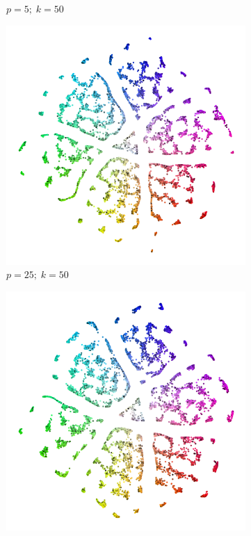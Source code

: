 \begin{figure}[!p]
\begin{subfigure}{0.3\linewidth}
    \caption{$p = 5;\; k = 50$}
  \end{subfigure}
\begin{subfigure}{0.3\linewidth}
  \centering
    \includegraphics[width=\linewidth]{img/ktsne_color_n_10000_embedding_eta_200_p_25_l_100_crosspolytope_k_50_K_50_pca_x_12_X_1_s_666-1}
    \caption{$p = 25;\; k = 50$}
\end{subfigure}
\begin{subfigure}{0.3\linewidth}
  \centering
    \includegraphics[width=\linewidth]{img/ktsne_color_n_10000_embedding_eta_200_p_50_l_100_crosspolytope_k_50_K_50_pca_x_12_X_1_s_666-1}

\end{subfigure}
\end{figure}
